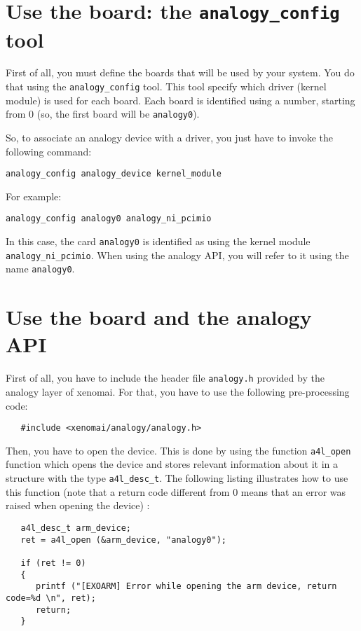 \documentclass[11pt]{book}
\begin{document}
   \section{Use the board: the \texttt{analogy\_config} tool}
   First of all, you must define the boards that will be used by your system.
   You do that using the \texttt{analogy\_config} tool. This tool specify which
   driver (kernel module) is used for each board. Each board is identified
   using a number, starting from 0 (so, the first board will be
   \texttt{analogy0}).

   So, to associate an analogy device with a driver, you just have to invoke the
   following command:
\begin{verbatim}
analogy_config analogy_device kernel_module
\end{verbatim}

   For example:
\begin{verbatim}
analogy_config analogy0 analogy_ni_pcimio
\end{verbatim}

   In this case, the card \texttt{analogy0} is identified as using the kernel
   module \texttt{analogy\_ni\_pcimio}. When using the analogy API, you will
   refer to it using the name \texttt{analogy0}.

   \section{Use the board and the analogy API}
   First of all, you have to include the header file \texttt{analogy.h} provided
   by the analogy layer of xenomai. For that, you have to use the following
   pre-processing code:

\begin{lstlisting}
   #include <xenomai/analogy/analogy.h>
\end{lstlisting}

   Then, you have to open the device. This is done by using the function
   \texttt{a4l\_open} function which opens the device and stores relevant
   information about it in a structure with the type \texttt{a4l\_desc\_t}. The
   following listing illustrates how to use this function (note that a return
   code different from 0 means that an error was raised when opening the device) :
   \begin{lstlisting}
   a4l_desc_t arm_device;
   ret = a4l_open (&arm_device, "analogy0");

   if (ret != 0)
   {
      printf ("[EXOARM] Error while opening the arm device, return code=%d \n", ret);
      return;
   }
   \end{lstlisting}
\end{document}
